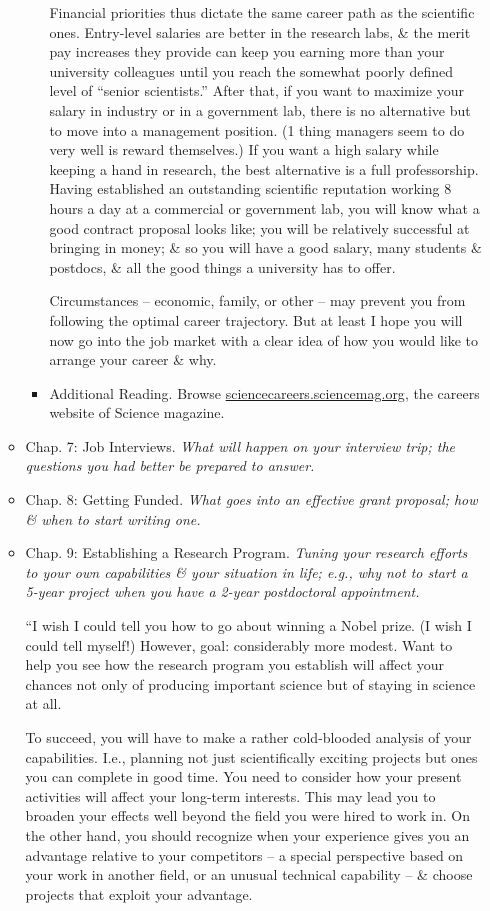 \documentclass{article}
\begin{document}
\begin{enumerate}
\begin{itemize}
\begin{itemize}
			Financial priorities thus dictate the same career path as the scientific ones. Entry-level salaries are better in the research labs, \& the merit pay increases they provide can keep you earning more than your university colleagues until you reach the somewhat poorly defined level of ``senior scientists.'' After that, if you want to maximize your salary in industry or in a government lab, there is no alternative but to move into a management position. (1 thing managers seem to do very well is reward themselves.) If you want a high salary while keeping a hand in research, the best alternative is a full professorship. Having established an outstanding scientific reputation working 8 hours a day at a commercial or government lab, you will know what a good contract proposal looks like; you will be relatively successful at bringing in money; \& so you will have a good salary, many students \& postdocs, \& all the good things a university has to offer.
			
			Circumstances -- economic, family, or other -- may prevent you from following the optimal career trajectory. But at least I hope you will now go into the job market with a clear idea of how you would like to arrange your career \& why.
			\item {\sf Additional Reading.} Browse \url{sciencecareers.sciencemag.org}, the careers website of Science magazine.
		\end{itemize}
		
		\item {\sf Chap. 7: Job Interviews.} {\it What will happen on your interview trip; the questions you had better be prepared to answer.}
		
		\item {\sf Chap. 8: Getting Funded.} {\it What goes into an effective grant proposal; how \& when to start writing one.}
		
		\item {\sf Chap. 9: Establishing a Research Program.} {\it Tuning your research efforts to your own capabilities \& your situation in life; e.g., why not to start a 5-year project when you have a 2-year postdoctoral appointment.}
		
		``I wish I could tell you how to go about winning a Nobel prize. (I wish I could tell myself!) However, goal: considerably more modest. Want to help you see how the research program you establish will affect your chances not only of producing important science but of staying in science at all.
		
		To succeed, you will have to make a rather cold-blooded analysis of your capabilities. I.e., planning not just scientifically exciting projects but ones you can complete in good time. You need to consider how your present activities will affect your long-term interests. This may lead you to broaden your effects well beyond the field you were hired to work in. On the other hand, you should recognize when your experience gives you an advantage relative to your competitors -- a special perspective based on your work in another field, or an unusual technical capability -- \& choose projects that exploit your advantage.
		

\end{itemize}
\end{enumerate}
\end{document}
